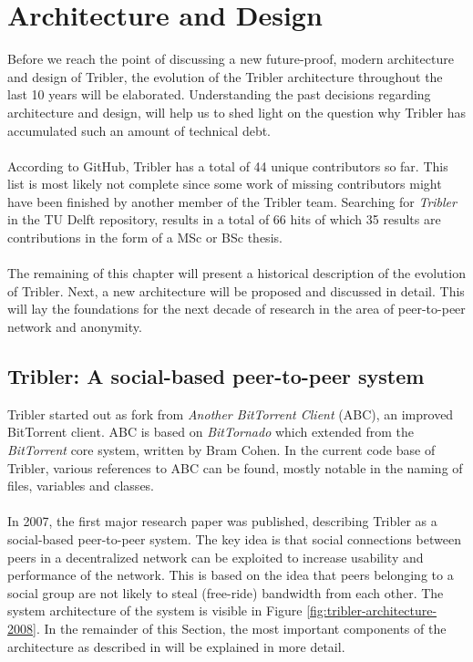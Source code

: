 \chapter{Architecture and Design}
\label{chapter:architecture}

Before we reach the point of discussing a new future-proof, modern architecture and design of Tribler, the evolution of the Tribler architecture  throughout the last 10 years will be elaborated. Understanding the past decisions regarding architecture and design, will help us to shed light on the question why Tribler has accumulated such an amount of technical debt.\\\\
According to GitHub, Tribler has a total of 44 unique contributors so far. This list is most likely not complete since some work of missing contributors might have been finished by another member of the Tribler team. Searching for \emph{Tribler} in the TU Delft repository, results in a total of 66 hits of which 35 results are contributions in the form of a MSc or BSc thesis.\\\\
The remaining of this chapter will present a historical description of the evolution of Tribler. Next, a new architecture will be proposed and discussed in detail. This will lay the foundations for the next decade of research in the area of peer-to-peer network and anonymity.

\section{Tribler: A social-based peer-to-peer system}
Tribler started out as fork from \emph{Another BitTorrent Client} (ABC), an improved BitTorrent client. ABC is based on \emph{BitTornado} which extended from the \emph{BitTorrent} core system, written by Bram Cohen. In the current code base of Tribler, various references to ABC can be found, mostly notable in the naming of files, variables and classes.\\\\
In 2007, the first major research paper was published, describing Tribler as a social-based peer-to-peer system\cite{pouwelse2008tribler}. The key idea is that social connections between peers in a decentralized network can be exploited to increase usability and performance of the network. This is based on the idea that peers belonging to a social group are not likely to steal (free-ride) bandwidth from each other. The system architecture of the system is visible in Figure \ref{fig:tribler-architecture-2008}. In the remainder of this Section, the most important components of the architecture as described in \cite{pouwelse2008tribler} will be explained in more detail.

